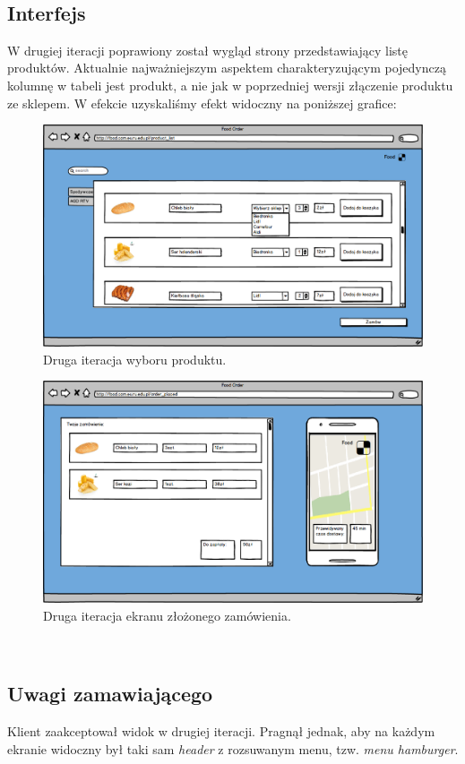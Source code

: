 \subsection{Interfejs}
W drugiej iteracji poprawiony został wygląd strony przedstawiający listę produktów. Aktualnie najważniejszym aspektem charakteryzującym pojedynczą kolumnę w tabeli jest produkt, a nie jak w poprzedniej wersji złączenie produktu ze sklepem. W efekcie uzyskaliśmy efekt widoczny na poniższej grafice:

\begin{figure}[H]
\centering
\includegraphics[width=15cm]{pictures/Lista_produktow_v2.png}
\caption{Druga iteracja wyboru produktu.}
\end{figure}

\begin{figure}[H]
\centering
\includegraphics[width=15cm]{pictures/Zamowienie_zlozone_v2.png}
\caption{Druga iteracja ekranu złożonego zamówienia.}
\end{figure}

\subsection{Uwagi zamawiającego}
Klient zaakceptował widok w drugiej iteracji. Pragnął jednak, aby na każdym ekranie widoczny był taki sam \textit{header} z rozsuwanym menu, tzw. \textit{menu hamburger}.